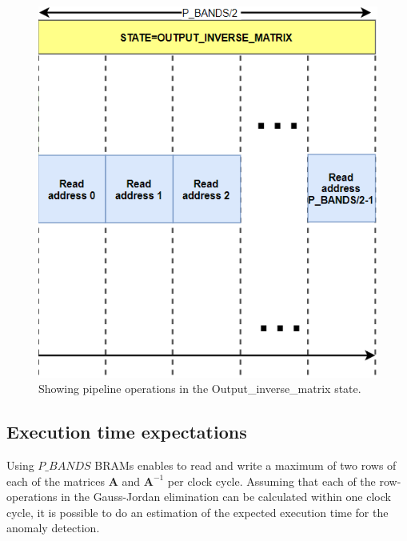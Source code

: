 \begin{figure}[H]
\centering
   \includegraphics[scale=0.5]{images/estimation_execution_time/pipeline_inverse_matrix_part_3.PNG}
  \caption{Showing pipeline operations in the Output\_inverse\_matrix state.  } 
  \label{fig:pipeline_inverse_part_3}
\end{figure}



\subsection{Execution time expectations}
Using $P\_BANDS$ BRAMs enables to read and write a maximum of two rows of each of the matrices $\textbf{A}$ and $\textbf{A}^{-1}$ per clock cycle.  Assuming that each of the row-operations in the Gauss-Jordan elimination can be calculated within one clock cycle, it is possible to do an estimation of the expected execution time for the anomaly detection. 





